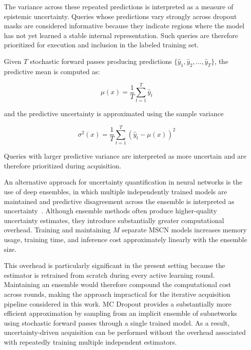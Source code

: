 The variance across these repeated predictions is interpreted as a measure of epistemic uncertainty. Queries whose predictions vary strongly across dropout masks are considered informative because they indicate regions where the model has not yet learned a stable internal representation. Such queries are therefore prioritized for execution and inclusion in the labeled training set.

Given $T$ stochastic forward passes producing predictions
$\{\hat{y}_1, \hat{y}_2, \dots, \hat{y}_T\}$,
the predictive mean is computed as:

\begin{equation}
\mu(x)=\frac{1}{T}\sum_{t=1}^{T}\hat{y}_t
\end{equation}

and the predictive uncertainty is approximated using the sample variance

\begin{equation}
\sigma^2(x)=\frac{1}{T}\sum_{t=1}^{T}(\hat{y}_t-\mu(x))^2
\end{equation}

Queries with larger predictive variance are interpreted as more uncertain and are therefore prioritized during acquisition.

An alternative approach for uncertainty quantification in neural networks is the use of deep ensembles, in which multiple independently trained models are maintained and predictive disagreement across the ensemble is interpreted as uncertainty~\cite{lakshminarayanan2017simplescalablepredictiveuncertainty}. Although ensemble methods often produce higher-quality uncertainty estimates, they introduce substantially greater computational overhead. Training and maintaining $M$ separate MSCN models increases memory usage, training time, and inference cost approximately linearly with the ensemble size.

This overhead is particularly significant in the present setting because the estimator is retrained from scratch during every active learning round. Maintaining an ensemble would therefore compound the computational cost across rounds, making the approach impractical for the iterative acquisition pipeline considered in this work. MC Dropout provides a substantially more efficient approximation by sampling from an implicit ensemble of subnetworks using stochastic forward passes through a single trained model. As a result, uncertainty-driven acquisition can be performed without the overhead associated with repeatedly training multiple independent estimators.

